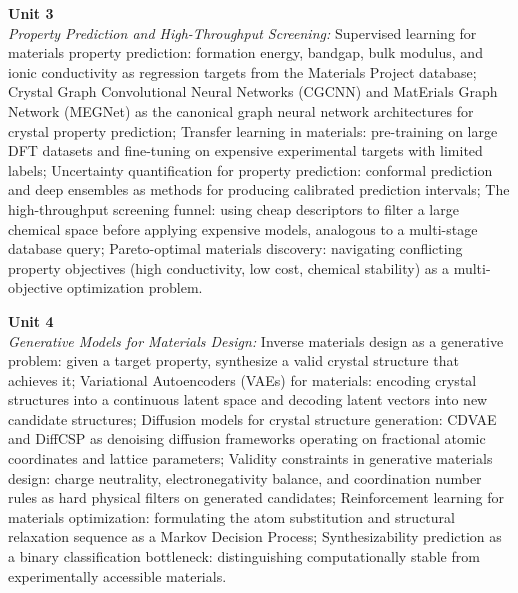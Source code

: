 \vspace{0.3cm}

\noindent\textbf{Unit 3} \\
\textit{Property Prediction and High-Throughput Screening:} Supervised learning for materials property prediction: formation energy, bandgap, bulk modulus, and ionic conductivity as regression targets from the Materials Project database; Crystal Graph Convolutional Neural Networks (CGCNN) and MatErials Graph Network (MEGNet) as the canonical graph neural network architectures for crystal property prediction; Transfer learning in materials: pre-training on large DFT datasets and fine-tuning on expensive experimental targets with limited labels; Uncertainty quantification for property prediction: conformal prediction and deep ensembles as methods for producing calibrated prediction intervals; The high-throughput screening funnel: using cheap descriptors to filter a large chemical space before applying expensive models, analogous to a multi-stage database query; Pareto-optimal materials discovery: navigating conflicting property objectives (high conductivity, low cost, chemical stability) as a multi-objective optimization problem.

\vspace{0.3cm}

\noindent\textbf{Unit 4} \\
\textit{Generative Models for Materials Design:} Inverse materials design as a generative problem: given a target property, synthesize a valid crystal structure that achieves it; Variational Autoencoders (VAEs) for materials: encoding crystal structures into a continuous latent space and decoding latent vectors into new candidate structures; Diffusion models for crystal structure generation: CDVAE and DiffCSP as denoising diffusion frameworks operating on fractional atomic coordinates and lattice parameters; Validity constraints in generative materials design: charge neutrality, electronegativity balance, and coordination number rules as hard physical filters on generated candidates; Reinforcement learning for materials optimization: formulating the atom substitution and structural relaxation sequence as a Markov Decision Process; Synthesizability prediction as a binary classification bottleneck: distinguishing computationally stable from experimentally accessible materials.

\vspace{0.3cm}

